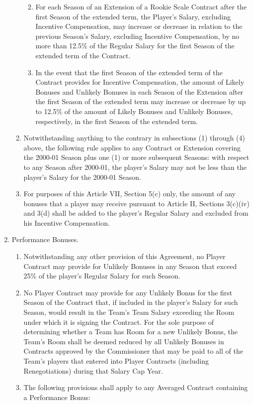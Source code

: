 \documentclass[
]{book}
\providecommand{\tightlist}{%
  \setlength{\itemsep}{0pt}\setlength{\parskip}{0pt}}
\begin{document}
\begin{enumerate}
\begin{enumerate}
    \begin{enumerate}
    \def\labelenumiii{(\roman{enumiii})}
    \tightlist
    \item
      For each Season of an Extension of a Rookie Scale Contract after the first Season of the extended term, the Player's Salary, excluding Incentive Compensation, may increase or decrease in relation to the previous Season's Salary, excluding Incentive Compensation, by no more than 12.5\% of the Regular Salary for the first Season of the extended term of the Contract.
    \item
      In the event that the first Season of the extended term of the Contract provides for Incentive Compensation, the amount of Likely Bonuses and Unlikely Bonuses in each Season of the Extension after the first Season of the extended term may increase or decrease by up to 12.5\% of the amount of Likely Bonuses and Unlikely Bonuses, respectively, in the first Season of the extended term.
    \end{enumerate}
  \item
    Notwithstanding anything to the contrary in subsections (1) through (4) above, the following rule applies to any Contract or Extension covering the 2000-01 Season plus one (1) or more subsequent Seasons: with respect to any Season after 2000-01, the player's Salary may not be less than the player's Salary for the 2000-01 Season.
  \item
    For purposes of this Article VII, Section 5(c) only, the amount of any bonuses that a player may receive pursuant to Article II, Sections 3(c)(iv) and 3(d) shall be added to the player's Regular Salary and excluded from his Incentive Compensation.
  \end{enumerate}
\item
  Performance Bonuses.

  \begin{enumerate}
  \def\labelenumii{(\arabic{enumii})}
  \tightlist
  \item
    Notwithstanding any other provision of this Agreement, no Player Contract may provide for Unlikely Bonuses in any Season that exceed 25\% of the player's Regular Salary for such Season.
  \item
    No Player Contract may provide for any Unlikely Bonus for the first Season of the Contract that, if included in the player's Salary for such Season, would result in the Team's Team Salary exceeding the Room under which it is signing the Contract. For the sole purpose of determining whether a Team has Room for a new Unlikely Bonus, the Team's Room shall be deemed reduced by all Unlikely Bonuses in Contracts approved by the Commissioner that may be paid to all of the Team's players that entered into Player Contracts (including Renegotiations) during that Salary Cap Year.
  \item
    The following provisions shall apply to any Averaged Contract containing a Performance Bonus:


\end{enumerate}
\end{enumerate}
\end{document}
